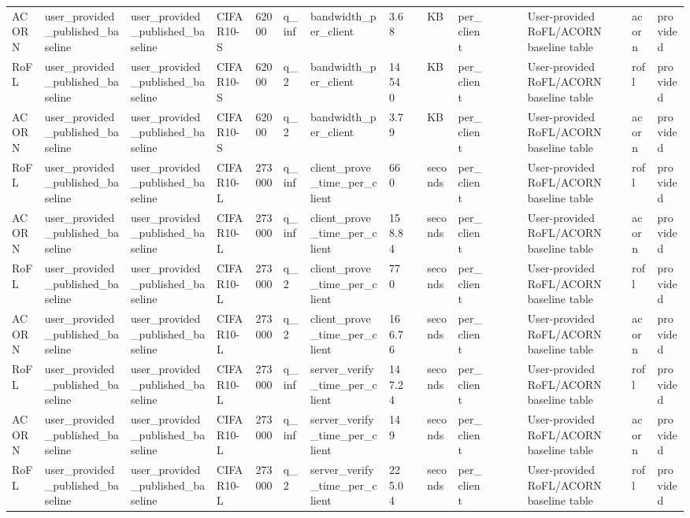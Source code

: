 \begin{table}[t]
\begin{tabular}{lllllllllllllllll}
ACORN & user\_provided\_published\_baseline & user\_provided\_published\_baseline & CIFAR10-S & 62000 & q\_inf & bandwidth\_per\_client & 3.68 &  & KB & per\_client &  &  &  & User-provided RoFL/ACORN baseline table & acorn & provided \\
RoFL & user\_provided\_published\_baseline & user\_provided\_published\_baseline & CIFAR10-S & 62000 & q\_2 & bandwidth\_per\_client & 14540 &  & KB & per\_client &  &  &  & User-provided RoFL/ACORN baseline table & rofl & provided \\
ACORN & user\_provided\_published\_baseline & user\_provided\_published\_baseline & CIFAR10-S & 62000 & q\_2 & bandwidth\_per\_client & 3.79 &  & KB & per\_client &  &  &  & User-provided RoFL/ACORN baseline table & acorn & provided \\
RoFL & user\_provided\_published\_baseline & user\_provided\_published\_baseline & CIFAR10-L & 273000 & q\_inf & client\_prove\_time\_per\_client & 660 &  & seconds & per\_client &  &  &  & User-provided RoFL/ACORN baseline table & rofl & provided \\
ACORN & user\_provided\_published\_baseline & user\_provided\_published\_baseline & CIFAR10-L & 273000 & q\_inf & client\_prove\_time\_per\_client & 158.84 &  & seconds & per\_client &  &  &  & User-provided RoFL/ACORN baseline table & acorn & provided \\
RoFL & user\_provided\_published\_baseline & user\_provided\_published\_baseline & CIFAR10-L & 273000 & q\_2 & client\_prove\_time\_per\_client & 770 &  & seconds & per\_client &  &  &  & User-provided RoFL/ACORN baseline table & rofl & provided \\
ACORN & user\_provided\_published\_baseline & user\_provided\_published\_baseline & CIFAR10-L & 273000 & q\_2 & client\_prove\_time\_per\_client & 166.76 &  & seconds & per\_client &  &  &  & User-provided RoFL/ACORN baseline table & acorn & provided \\
RoFL & user\_provided\_published\_baseline & user\_provided\_published\_baseline & CIFAR10-L & 273000 & q\_inf & server\_verify\_time\_per\_client & 147.24 &  & seconds & per\_client &  &  &  & User-provided RoFL/ACORN baseline table & rofl & provided \\
ACORN & user\_provided\_published\_baseline & user\_provided\_published\_baseline & CIFAR10-L & 273000 & q\_inf & server\_verify\_time\_per\_client & 149 &  & seconds & per\_client &  &  &  & User-provided RoFL/ACORN baseline table & acorn & provided \\
RoFL & user\_provided\_published\_baseline & user\_provided\_published\_baseline & CIFAR10-L & 273000 & q\_2 & server\_verify\_time\_per\_client & 225.04 &  & seconds & per\_client &  &  &  & User-provided RoFL/ACORN baseline table & rofl & provided \\

\end{tabular}
\end{table}
